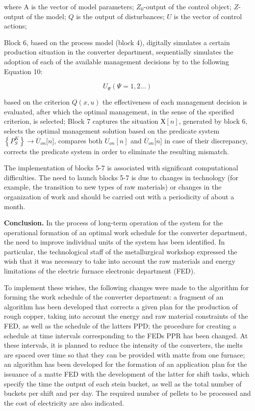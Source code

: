 \begin{multicols}{2}
where A is the vector of model parameters; $Z_{0}$-output
of the control object; $Z$- output of the model; $Q$ is the output of
disturbances; $U$ is the vector of control actions;

Block 6, based on the process model (block 4), digitally simulates a
certain production situation in the converter department, sequentially
simulates the adoption of each of the available management decisions by
to the following Equation 10:

\begin{equation}
U_{\Psi}(\Psi=1,2\ldots)
\end{equation}

based on the criterion $Q(x,u)$ the effectiveness of each
management decision is evaluated, after which the optimal management, in
the sense of the specified criterion, is selected; Block 7 captures the
situation $Х[n]$, generated by block 6, selects the optimal
management solution based on the predicate system
$\left\{ P_{S}^{K} \right\} \rightarrow {\overline{U}}_{on}\lbrack n\rbrack$,
compares both $U_{on}[n]$ and
$\overline{U}_{on}\lbrack n\rbrack$ in case of their discrepancy,
corrects the predicate system in order to eliminate the resulting
mismatch.

The implementation of blocks 5-7 is associated with significant
computational difficulties. The need to launch blocks 5-7 is due to
changes in technology (for example, the transition to new types of raw
materials) or changes in the organization of work and should be carried
out with a periodicity of about a month.

{\bfseries Conclusion.} In the process of long-term operation of the system
for the operational formation of an optimal work schedule for the
converter department, the need to improve individual units of the system
has been identified. In particular, the technological staff of the
metallurgical workshop expressed the wish that it was necessary to take
into account the raw materials and energy limitations of the electric
furnace electronic department (FED).

To implement these wishes, the following changes were made to the
algorithm for forming the work schedule of the converter department: a
fragment of an algorithm has been developed that corrects a given plan
for the production of rough copper, taking into account the energy and
raw material constraints of the FED, as well as the schedule of the
latter\textquotesingle s PPD; the procedure for creating a schedule at
time intervals corresponding to the FED\textquotesingle s PPR has been
changed. At these intervals, it is planned to reduce the intensity of
the converters, the melts are spaced over time so that they can be
provided with matte from one furnace; an algorithm has been developed
for the formation of an application plan for the issuance of a matte FED
with the development of the latter for shift tasks, which specify the
time the output of each stein bucket, as well as the total number of
buckets per shift and per day. The required number of pellets to be
processed and the cost of electricity are also indicated.


\end{multicols}
